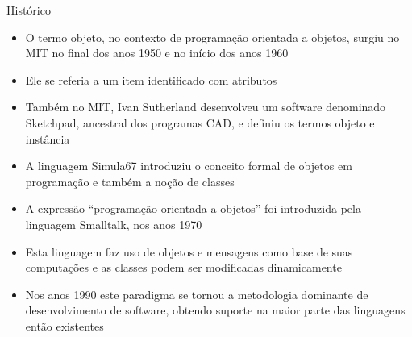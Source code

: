 \begin{frame}[fragile]{Histórico}

    \begin{itemize}
        \item O termo objeto, no contexto de programação orientada a objetos, surgiu no MIT no
            final dos anos 1950 e no início dos anos 1960

        \item Ele se referia a um item identificado com atributos

        \item Também no MIT, Ivan Sutherland desenvolveu um software denominado Sketchpad, ancestral
            dos programas CAD, e definiu os termos objeto e instância

        \item A linguagem Simula67 introduziu o conceito formal de objetos em programação e também
            a noção de classes

        \item A expressão ``programação orientada a objetos'' foi introduzida pela linguagem 
            Smalltalk, nos anos 1970

        \item Esta linguagem faz uso de objetos e mensagens como base de suas computações e as
            classes podem ser modificadas dinamicamente

        \item Nos anos 1990 este paradigma se tornou a metodologia dominante de desenvolvimento 
            de software, obtendo suporte na maior parte das linguagens então existentes
    \end{itemize}

\end{frame}

